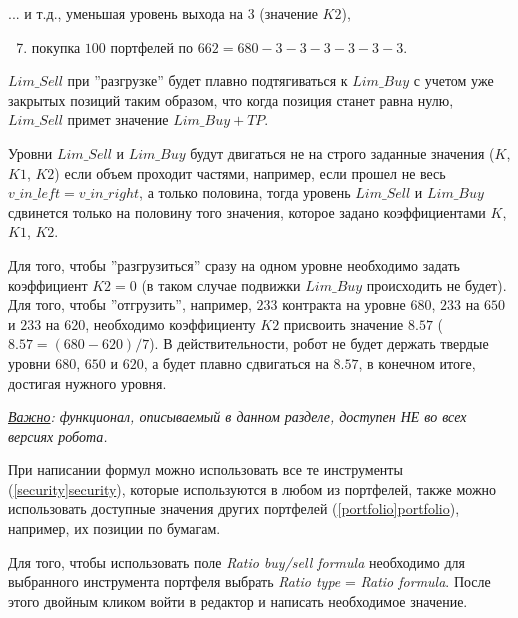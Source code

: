 ... и т.д., уменьшая уровень выхода на $3$ (значение $K2$),

\begin{enumerate}
\setcounter{enumi}{6}
\item покупка $100$ портфелей по $662 = 680 - 3 - 3 - 3 - 3 - 3 - 3$.
\end{enumerate}
\noindent$Lim\_Sell$ при ''разгрузке'' будет плавно подтягиваться к $Lim\_Buy$ с учетом уже закрытых позиций таким образом, что когда позиция станет равна нулю, $Lim\_Sell$
примет значение $Lim\_Buy + TP$.

Уровни  $Lim\_Sell$ и $Lim\_Buy$ будут двигаться не на строго заданные значения ($K$, $K1$, $K2$) если объем проходит частями, например, если прошел не весь $v\_in\_left = v\_in\_right$, а
только половина, тогда уровень $Lim\_Sell$ и $Lim\_Buy$ сдвинется только на половину того значения, которое задано  коэффициентами $K$, $K1$, $K2$.

Для того, чтобы ''разгрузиться'' сразу на одном уровне необходимо задать коэффициент $K2 = 0$ (в таком случае подвижки $Lim\_Buy$ происходить не будет).
Для того, чтобы ''отгрузить'', например, $233$ контракта на уровне $680$, $233$ на $650$ и $233$ на $620$, необходимо коэффициенту $K2$ присвоить значение $8.57$ ($8.57 = (680 - 620) / 7$).
В действительности, робот  не будет держать твердые уровни $680$, $650$ и $620$, а будет плавно сдвигаться на $8.57$, в конечном итоге, достигая нужного уровня.

\newpage

\begin{center}
\end{center}

\noindent\textit{\underline{Важно}: функционал, описываемый в данном разделе, доступен НЕ во всех версиях робота.\newline}



\label{robot_formulas_examples}

При написании формул можно использовать все те инструменты (\hyperref[security]{\ref{security}security}), которые
используются в любом из портфелей, также можно использовать доступные значения других портфелей (\hyperref[portfolio]{\ref{portfolio}portfolio}),
например, их позиции по бумагам.

Для того, чтобы использовать поле \textit{Ratio buy/sell formula} необходимо для выбранного инструмента портфеля выбрать \textit{Ratio type} = \textit{Ratio formula}.
После этого двойным кликом войти в редактор и написать необходимое значение.\newline

